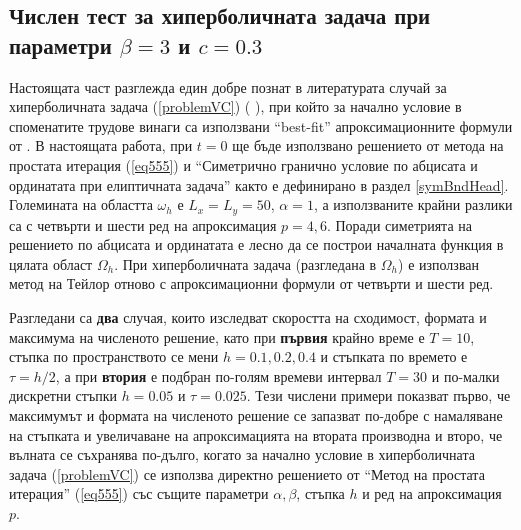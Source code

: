 \documentclass[a4paper]{article}
\newcommand{\rf}[1]{(\ref{#1})}
\theoremstyle{remark}
\begin{document}
\subsection{Числен тест за хиперболичната задача при параметри $\beta = 3$ и $c=0.3$} \label{numTestbt3c03}
Настоящата част разглежда един добре познат в литературата случай за хиперболичната задача \rf{problemVC} ( \cite{ref21, dani, milenaDani, ref22} ), при който за начално условие в споменатите трудове винаги са използвани ``best-fit'' апроксимационните формули от \cite{Ch2011}. В настоящата работа, при $t=0$ ще бъде използвано решението от метода на простата итерация \rf{eq555} и  ``Симетрично гранично условие по абцисата и ординатата при елиптичната задача'' както е дефинирано в раздел \ref{symBndHead}. Големината на областта $\omega_h$ е $L_x = L_y = 50$, $\alpha = 1$, а използваните крайни разлики са с четвърти и шести ред на апроксимация $p=4, 6$. Поради симетрията на решението по абцисата и ординатата е лесно да се построи началната функция в цялата област $\Omega_h$. При хиперболичната задача (разгледана в $\Omega_h$) е използван метод на Тейлор отново с апроксимационни формули от четвърти и шести ред.

Разгледани са \textbf{два} случая, които изследват скоростта на сходимост, формата и максимума на численото решение, като при \textbf{първия} крайно време е {\boldmath $T=10$}, стъпка по пространството се мени {\boldmath $h=0.1, 0.2, 0.4$} и стъпката по времето е $\tau = h/2$, а при \textbf{втория} е подбран по-голям времеви интервал {\boldmath $T=30$} и по-малки дискретни стъпки {\boldmath $h=0.05$} и {\boldmath $\tau=0.025$}. Тези числени примери показват първо, че максимумът и формата на численото решение се запазват по-добре с намаляване на стъпката и увеличаване на апроксимацията на втората производна и второ, че вълната се съхранява по-дълго, когато за начално условие в хиперболичната задача \rf{problemVC} се използва директно решението от ``Метод на простата итерация'' \rf{eq555} със същите параметри $\alpha, \beta$, стъпка $h$ и ред на апроксимация $p$.
\end{document}
